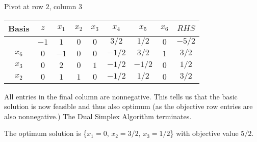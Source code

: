 \documentclass{article}[12pt,a4paper]
\begin{document}
\begin{enumerate}
  Pivot at row $2$, column $3$
  \begin{center}
  \begin{tabular}{c | c | c c c c c c | c}
  Basis & $z$ & $x_1$ & $x_2$ & $x_3$ & $x_4$ & $x_5$ & $x_6$ & $RHS$ \\ \hline
           & $-1$ & $1$ & $0$ & $0$ & $3/2$ & $1/2$ & $0$ & $-5/2$ \\ \hline
  $x_6$ & $0$ & $-1$ & $0$ & $0$ & $-1/2$ & $3/2$ & $1$ & $3/2$ \\
  $x_3$ & $0$ & $2$ & $0$ & $1$ & $-1/2$ & $-1/2$ & $0$ & $1/2$ \\
  $x_2$ & $0$ & $1$ & $1$ & $0$ & $-1/2$ & $1/2$ & $0$ & $3/2$
  \end{tabular}
  \end{center}  
  All entries in the final column are nonnegative. This tells us that the basic solution is now feasible
  and thus also optimum (as the objective row entries are also nonnegative.) The Dual Simplex Algorithm 
  terminates.
  
  The optimum solution is \{$x_1 = 0$, $x_2 = 3/2$, $x_3 = 1/2$\} with objective value $5/2$.
   

\end{enumerate}
\end{document}
